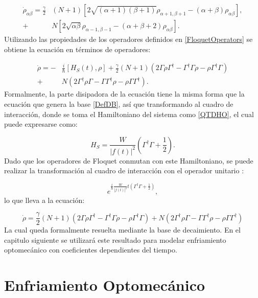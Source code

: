 \documentclass[a4paper,10pt]{report}
\begin{document}
\begin{align*}
\dot{\rho}_{\alpha \beta} = \frac{\gamma}{2}&(N+1)[2\sqrt{(\alpha+1)(\beta + 1)}\rho_{\alpha+1,\beta+1} - (\alpha + \beta)\rho_{\alpha \beta}],\\
+& N[2\sqrt{\alpha \beta}\rho_{\alpha-1,\beta-1} - (\alpha + \beta + 2)\rho_{\alpha \beta}].
\end{align*}Utilizando las propiedades de los operadores definidos en \eqref{FloquetOperators} se obtiene la ecuación en términos de operadores:

\begin{align*}
\dot{\rho} = -&\frac{i}{\hbar}[H_S (t),\rho] + \frac{\gamma}{2}(N+1)(2\Gamma\rho\Gamma^\dagger - \Gamma^\dagger\Gamma \rho - \rho \Gamma^\dagger \Gamma )\\
 +& N(2\Gamma^\dagger \rho \Gamma - \Gamma \Gamma^\dagger \rho - \rho \Gamma\Gamma^\dagger).
\end{align*} Formalmente, la parte disipadora de la ecuación tiene la misma forma que la ecuación que genera la base \ref{DefDB}, así que transformando al cuadro de interacción, donde se toma el Hamiltoniano del sistema como \ref{QTDHO}, el cual puede expresarse como\cite{BrownPT}:

\begin{equation}
H_S = \frac{W}{|f(t)|^2}(\Gamma^\dagger \Gamma + \frac{1}{2}).
\end{equation} Dado que los operadores de Floquet conmutan con este Hamiltoniano, se puede realizar la transformación al cuadro de interacción con el operador unitario \cite{SakuraiQM}:

\begin{equation}
 e^{\frac{i}{\hbar}\frac{W}{|f(t)|^2}t(\Gamma^\dagger \Gamma + \frac{1}{2})},
\end{equation}lo que lleva a la ecuación:

\begin{equation} \label{GammaLindblat}
\dot{\rho}=\frac{\gamma}{2}(N+1)(2\Gamma\rho\Gamma^\dagger - \Gamma^\dagger\Gamma \rho - \rho \Gamma^\dagger \Gamma )
 + N(2\Gamma^\dagger \rho \Gamma - \Gamma \Gamma^\dagger \rho - \rho \Gamma\Gamma^\dagger)
\end{equation}La cual queda formalmente resuelta mediante la base de decaimiento. En el capitulo siguiente se utilizará este resultado para modelar enfriamiento optomecánico con coeficientes dependientes del tiempo.


\chapter{Enfriamiento Optomecánico}
\end{document}
